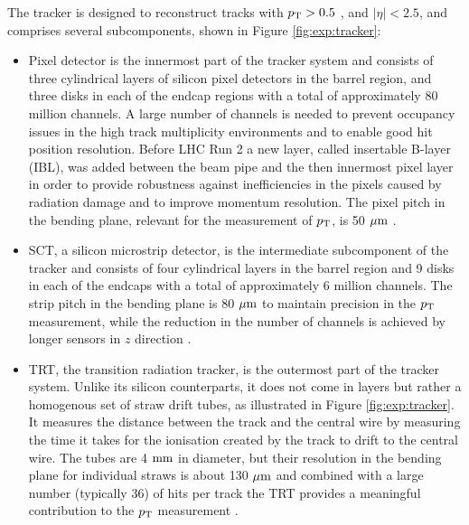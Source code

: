 The tracker is designed to reconstruct tracks with $p_{\text{T}} > 0.5$ \GeV, and
$|\eta| < 2.5$, and comprises several subcomponents, shown in Figure
\ref{fig:exp:tracker}:
\begin{itemize}
\item Pixel detector is the innermost part of the tracker system and
consists of three cylindrical layers of silicon pixel detectors in the
barrel region, and three disks in each of the endcap regions with a total of
approximately 80 million channels. A large number of channels is needed
to prevent occupancy issues in the high track multiplicity environments
and to enable good hit position resolution. Before LHC Run 2 a new layer,
called insertable B-layer (IBL), was added between the beam pipe and the
then innermost pixel layer in order to provide robustness against
inefficiencies in the pixels caused by radiation damage and to improve
momentum resolution. The pixel pitch in the bending plane, relevant for the
measurement of $p_{\text{T}}$, is 50 $\mu\text{m}$ \cite{CERN-LHCC-97-016, Aad:2008zzm, Capeans:1291633}. 
\item SCT, a silicon microstrip detector, is the intermediate subcomponent
of the tracker and consists of four cylindrical layers in the barrel region
and 9 disks in each of the endcaps with a total of approximately 6 million
channels. The strip pitch in the bending plane is 80 $\mu\text{m}$ to maintain
precision in the $p_{\text{T}}$ measurement, while the reduction in the number of
channels is achieved by longer sensors in $z$ direction \cite{CERN-LHCC-97-016, Aad:2008zzm}.
\item TRT, the transition radiation tracker, is the outermost part of the
tracker system. Unlike its silicon counterparts, it does not come in layers
but rather a homogenous set of straw drift tubes, as illustrated in
Figure \ref{fig:exp:tracker}. It measures the distance between the track
and the central wire by measuring the time it takes for the ionisation
created by the track to drift to the central wire. The tubes are 4 $\text{mm}$
in diameter, but their resolution in the bending plane for individual
straws is about 130 $\mu\text{m}$ and combined with a large number (typically 36)
of hits per track the TRT provides a meaningful contribution to the
$p_{\text{T}}$ measurement \cite{CERN-LHCC-97-016, Aad:2008zzm}.
\end{itemize}

